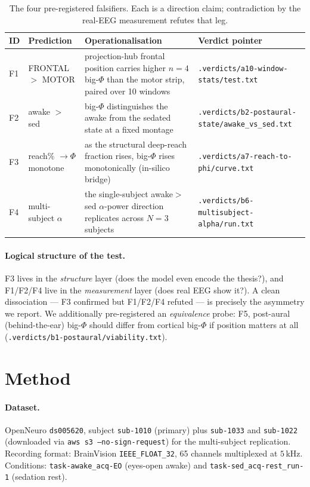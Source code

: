 \documentclass[11pt,a4paper]{article}
\begin{document}
\begin{table}[h]
\centering
\caption{The four pre-registered falsifiers. Each is a direction claim;
contradiction by the real-EEG measurement refutes that leg.}
\label{tab:falsifiers}
\small
\begin{tabular}{@{}llp{4.6cm}l@{}}
\toprule
ID & Prediction & Operationalisation & Verdict pointer \\
\midrule
F1 & FRONTAL $>$ MOTOR & projection-hub frontal position carries higher
$n{=}4$ big-$\Phi$ than the motor strip, paired over 10 windows &
\texttt{.verdicts/a10-window-stats/test.txt} \\
F2 & awake $>$ sed & big-$\Phi$ distinguishes the awake from the sedated state
at a fixed montage &
\texttt{.verdicts/b2-postaural-state/awake\_vs\_sed.txt} \\
F3 & reach\% $\to\Phi$ monotone & as the structural deep-reach fraction rises,
big-$\Phi$ rises monotonically (in-silico bridge) &
\texttt{.verdicts/a7-reach-to-phi/curve.txt} \\
F4 & multi-subject $\alpha$ & the single-subject awake$>$sed $\alpha$-power
direction replicates across $N{=}3$ subjects &
\texttt{.verdicts/b6-multisubject-alpha/run.txt} \\
\bottomrule
\end{tabular}
\end{table}

\paragraph{Logical structure of the test.}
F3 lives in the \emph{structure} layer (does the model even encode the thesis?),
and F1/F2/F4 live in the \emph{measurement} layer (does real EEG show it?). A
clean dissociation --- F3 confirmed but F1/F2/F4 refuted --- is precisely the
asymmetry we report. We additionally pre-registered an \emph{equivalence}
probe: F5, post-aural (behind-the-ear) big-$\Phi$ should differ from cortical
big-$\Phi$ if position matters at all
(\texttt{.verdicts/b1-postaural/viability.txt}).

\section{Method}\label{sec:method}

\paragraph{Dataset.}
OpenNeuro \texttt{ds005620}, subject \texttt{sub-1010} (primary) plus
\texttt{sub-1033} and \texttt{sub-1022} (downloaded via
\texttt{aws s3 --no-sign-request}) for the multi-subject replication. Recording
format: BrainVision \texttt{IEEE\_FLOAT\_32}, 65 channels multiplexed at
$5\,$kHz. Conditions: \texttt{task-awake\_acq-EO} (eyes-open awake) and
\texttt{task-sed\_acq-rest\_run-1} (sedation rest).
\end{document}
